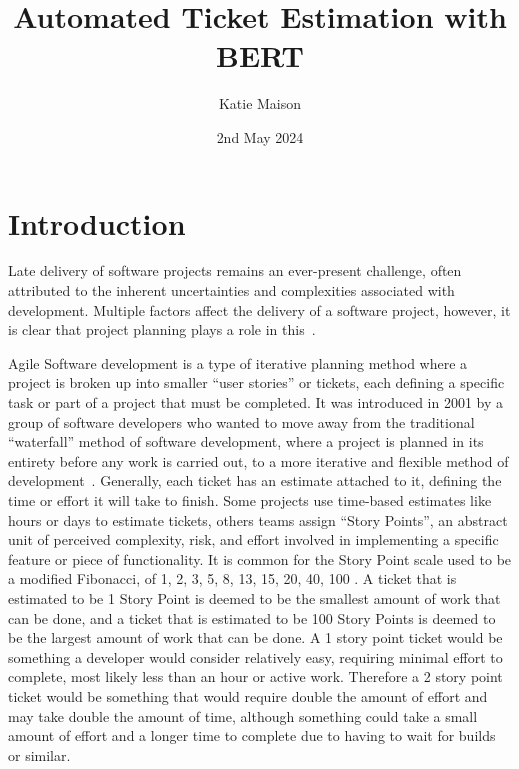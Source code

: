 \documentclass{UoYCSproject}
\author{Katie Maison}
\title{Automated Ticket Estimation with BERT}
\date{2nd May 2024}
\begin{document}
\maketitle
\listoffigures
\listoftables



    \chapter{Introduction}
    \label{ch:introduction}
    \setcounter{page}{1}


    Late delivery of software projects remains an ever-present challenge, often attributed to the inherent uncertainties and complexities associated with development.
    Multiple factors affect the delivery of a software project, however, it is clear that project planning plays a role in this~\cite{CHOW2008961}. \par
    Agile Software development is a type of iterative planning method where a project is broken up into smaller “user stories” or tickets, each defining a specific task or part of a project that must be completed.
    It was introduced in 2001 by a group of software developers who wanted to move away from the traditional “waterfall” method of software development, where a project is planned in its entirety before any work is carried out, to a more iterative and flexible method of development~\cite{beck2001agile}.
    Generally, each ticket has an estimate attached to it, defining the time or effort it will take to finish.
    Some projects use time-based estimates like hours or days to estimate tickets, others teams assign “Story Points”, an abstract unit of perceived complexity, risk, and effort involved in implementing a specific feature or piece of functionality.
    It is common for the Story Point scale used to be a modified Fibonacci, of 1, 2, 3, 5, 8, 13, 15, 20, 40, 100 \cite{scrumFib}.
    A ticket that is estimated to be 1 Story Point is deemed to be the smallest amount of work that can be done, and a ticket that is estimated to be 100 Story Points is deemed to be the largest amount of work that can be done.
    A 1 story point ticket would be something a developer would consider relatively easy, requiring minimal effort to complete, most likely less than an hour or active work.
    Therefore a 2 story point ticket would be something that would require double the amount of effort and may take double the amount of time, although something could take a small amount of effort and a longer time to complete due to having to wait for builds or similar.
\end{document}
